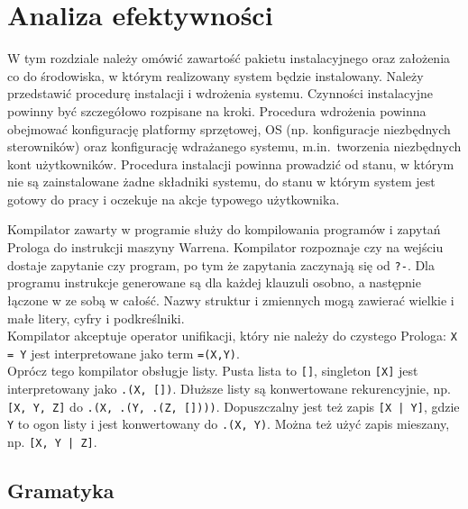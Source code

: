 \chapter{Analiza efektywności}
\thispagestyle{chapterBeginStyle}

\iffalse
W tym rozdziale należy omówić zawartość pakietu instalacyjnego oraz założenia co do środowiska, w którym realizowany system będzie instalowany. Należy przedstawić procedurę instalacji i wdrożenia systemu. Czynności instalacyjne powinny być szczegółowo rozpisane na kroki. Procedura wdrożenia powinna obejmować konfigurację platformy sprzętowej, OS (np. konfiguracje niezbędnych sterowników) oraz konfigurację wdrażanego systemu, m.in.\ tworzenia niezbędnych kont użytkowników. Procedura instalacji powinna prowadzić od stanu, w którym nie są zainstalowane żadne składniki systemu, do stanu w którym system jest gotowy do pracy i oczekuje na akcje typowego użytkownika.


Kompilator zawarty w programie służy do kompilowania programów i zapytań Prologa do instrukcji maszyny Warrena. Kompilator rozpoznaje czy na wejściu dostaje zapytanie czy program, po tym że zapytania zaczynają się od \texttt{?-}. Dla programu instrukcje generowane są dla każdej klauzuli osobno, a następnie łączone w ze sobą w całość. Nazwy struktur i zmiennych mogą zawierać wielkie i małe litery, cyfry i podkreślniki.\\
Kompilator akceptuje operator unifikacji, który nie należy do czystego Prologa: \texttt{X = Y} jest interpretowane jako term \texttt{=(X,Y)}.\\
Oprócz tego kompilator obsługje listy. Pusta lista to \texttt{[]}, singleton \texttt{[X]} jest interpretowany jako \texttt{.(X, [])}. Dłuższe listy są konwertowane rekurencyjnie, np. \texttt{[X, Y, Z]} do \texttt{.(X, .(Y, .(Z, [])))}. Dopuszczalny jest też zapis \texttt{[X | Y]}, gdzie \texttt{Y} to ogon listy i jest konwertowany do \texttt{.(X, Y)}. Można też użyć zapis mieszany, np. \texttt{[X, Y | Z]}.

\section{Gramatyka}

